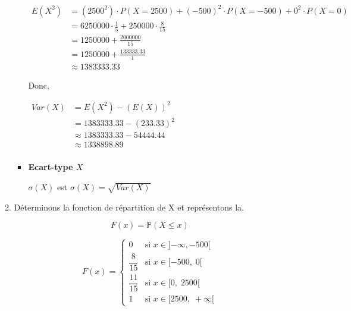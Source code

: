 \documentclass[12pt,a4paper]{article}
\begin{document}
\begin{enumerate}
\begin{enumerate}
\begin{itemize}
                              \(
                              \begin{aligned}
                                  E(X^2) & = (2500^2) \cdot P(X = 2500) + (-500)^2 \cdot P(X = -500) + 0^2 \cdot P(X = 0) \\
                                         & = 6250000 \cdot \frac{1}{5} + 250000 \cdot \frac{8}{15}                        \\
                                         & = 1250000 + \frac{2000000}{15}                                                 \\
                                         & = 1250000 + \frac{133333.33}{1}                                                \\
                                         & \approx 1383333.33
                              \end{aligned}
                              \)

                              Donc,

                              \(
                              \begin{aligned}
                                  Var(X) & = E(X^2) - (E(X))^2           \\
                                         & = 1383333.33 - (233.33)^2     \\
                                         & \approx 1383333.33 - 54444.44 \\
                                         & \approx 1338898.89            \\
                              \end{aligned}
                              \)

                        \item  \textbf{Ecart-type $X$}

                              $\sigma(X)$ est $\sigma(X) = \sqrt{Var(X)}$
                    \end{itemize}
              \item Déterminons la fonction de répartition de X et représentons la.

                    \[
                        F(x) = \mathbb{P}(X \leq x)
                    \]

                    \[
                        F(x) =
                        \begin{cases}
                            0              & \text{si } x \in ]{-\infty}, -500[ \\
                            \dfrac{8}{15}  & \text{si } x \in [-500,\; 0[       \\
                            \dfrac{11}{15} & \text{si } x \in [0,\; 2500[       \\
                            1              & \text{si } x \in [2500,\; +\infty[
                        \end{cases}
                    \]



\end{enumerate}
\end{enumerate}
\end{document}
